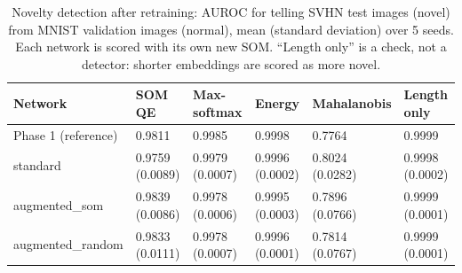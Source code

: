 \begin{table}[H]
\centering
\renewcommand{\arraystretch}{1.1}
\footnotesize
\begin{tabular}{|l|C{0.135\textwidth}|C{0.135\textwidth}|C{0.135\textwidth}|C{0.135\textwidth}|C{0.135\textwidth}|}
\hline
\textbf{Network} & \textbf{SOM QE} & \textbf{Max-softmax} & \textbf{Energy} & \textbf{Mahalanobis} & \textbf{Length only} \\ \hline
Phase 1 (reference) & 0.9811 & 0.9985 & 0.9998 & 0.7764 & 0.9999 \\ \hline
standard & 0.9759 (0.0089) & 0.9979 (0.0007) & 0.9996 (0.0002) & 0.8024 (0.0282) & 0.9998 (0.0002) \\ \hline
augmented\_som & 0.9839 (0.0086) & 0.9978 (0.0006) & 0.9995 (0.0003) & 0.7896 (0.0766) & 0.9999 (0.0001) \\ \hline
augmented\_random & 0.9833 (0.0111) & 0.9978 (0.0007) & 0.9996 (0.0001) & 0.7814 (0.0767) & 0.9999 (0.0001) \\ \hline
\end{tabular}
\caption{Novelty detection after retraining: AUROC for telling SVHN test images (novel) from MNIST validation images (normal), mean (standard deviation) over 5 seeds. Each network is scored with its own new SOM. ``Length only'' is a check, not a detector: shorter embeddings are scored as more novel.}
\label{tab:novelty_after}
\end{table}
